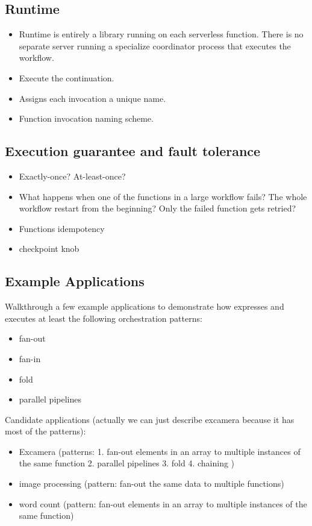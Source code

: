 \subsection{Runtime}

\begin{itemize}
	\item Runtime is entirely a library running on each serverless function. There
	is no separate server running a specialize coordinator process that
	executes the workflow.
	\item Execute the continuation.
	\item Assigns each invocation a unique name.
	\item Function invocation naming scheme.
\end{itemize}



\subsection{Execution guarantee and fault tolerance}

\begin{itemize}
	\item Exactly-once? At-least-once?
	\item What happens when one of the functions in a large workflow fails? The whole
workflow restart from the beginning? Only the failed function gets retried?
	\item Functions idempotency
	\item \name{} checkpoint knob
\end{itemize}

\subsection{Example Applications}

Walkthrough a few example applications to demonstrate how \name{} expresses and executes at least the following orchestration patterns:
\begin{itemize}
	\item fan-out
	\item fan-in
	\item fold
	\item parallel pipelines
\end{itemize}

Candidate applications (actually we can just describe excamera because it has most of the patterns):

\begin{itemize}
	\item Excamera (patterns: 1. fan-out elements in an array to multiple
	instances of the same function 2. parallel pipelines  3. fold 4. chaining )
	\item image processing (pattern: fan-out the same data to multiple
	functions)
	\item word count (pattern: fan-out elements in an array to multiple
	instances of the same function)
\end{itemize}
